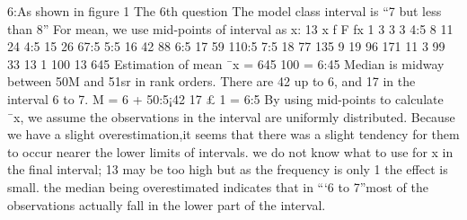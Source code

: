 6:As shown in figure 1
The 6th question
The model class interval is “7 but less than 8” For mean, we use mid-points of interval
as x:
13
x f F fx
1 3 3 3
4:5 8 11 24
4:5 15 26 67:5
5:5 16 42 88
6:5 17 59 110:5
7:5 18 77 135
9 19 96 171
11 3 99 33
13 1 100 13
645
Estimation of mean ¯x = 645
100 = 6:45
Median is midway between 50M and 51sr in rank orders. There are 42 up to 6, and 17
in the interval 6 to 7.
M = 6 + 50:5¡42
17 £ 1 = 6:5
By using mid-points to calculate ¯x, we assume the observations in the interval are uniformly
distributed. Because we have a slight overestimation,it seems that there was a
slight tendency for them to occur nearer the lower limits of intervals. we do not know
what to use for x in the final interval; 13 may be too high but as the frequency is only
1 the effect is small. the median being overestimated indicates that in “‘6 to 7”most of
the observations actually fall in the lower part of the interval.
